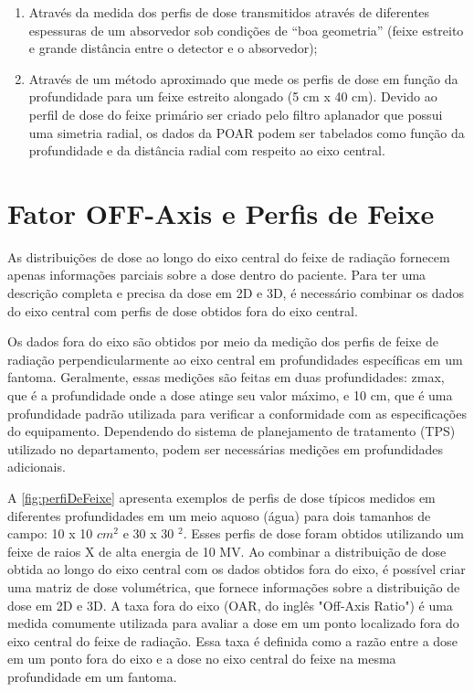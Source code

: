 \documentclass[11pt,a4paper]{article}
\newcounter{exemplo}
\begin{document}
        \begin{enumerate}
            \item Através da medida dos perfis de dose transmitidos através de diferentes espessuras de um absorvedor sob condições de ``boa geometria'' (feixe estreito e grande distância entre o detector e o absorvedor);
            \item Através de um método aproximado que mede os perfis de dose em função da profundidade para um feixe estreito alongado (5 cm x 40 cm). Devido ao perfil de dose do feixe primário ser criado pelo filtro aplanador que possui uma simetria radial, os dados da POAR podem ser tabelados como função da profundidade e da distância radial com respeito ao eixo central.
        \end{enumerate}
    
\section{Fator OFF-Axis e Perfis de Feixe}


    As distribuições de dose ao longo do eixo central do feixe de radiação fornecem apenas informações parciais sobre a dose dentro do paciente. Para ter uma descrição completa e precisa da dose em 2D e 3D, é necessário combinar os dados do eixo central com perfis de dose obtidos fora do eixo central. 

    Os dados fora do eixo são obtidos por meio da medição dos perfis de feixe de radiação perpendicularmente ao eixo central em profundidades específicas em um fantoma. Geralmente, essas medições são feitas em duas profundidades: zmax, que é a profundidade onde a dose atinge seu valor máximo, e 10 cm, que é uma profundidade padrão utilizada para verificar a conformidade com as especificações do equipamento. Dependendo do sistema de planejamento de tratamento (TPS) utilizado no departamento, podem ser necessárias medições em profundidades adicionais.

    A \ref{fig:perfiDeFeixe} apresenta exemplos de perfis de dose típicos medidos em diferentes profundidades em um meio aquoso (água) para dois tamanhos de campo: 10 x 10 $cm^2$ e 30 x 30 $^2$. Esses perfis de dose foram obtidos utilizando um feixe de raios X de alta energia de 10 MV. Ao combinar a distribuição de dose obtida ao longo do eixo central com os dados obtidos fora do eixo, é possível criar uma matriz de dose volumétrica, que fornece informações sobre a distribuição de dose em 2D e 3D. A taxa fora do eixo (OAR, do inglês "Off-Axis Ratio") é uma medida comumente utilizada para avaliar a dose em um ponto localizado fora do eixo central do feixe de radiação. Essa taxa é definida como a razão entre a dose em um ponto fora do eixo e a dose no eixo central do feixe na mesma profundidade em um fantoma.
\end{document}
